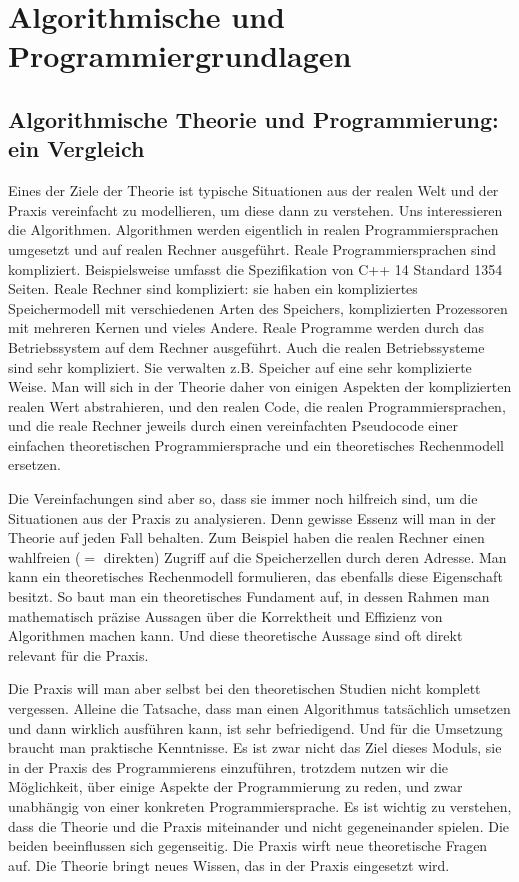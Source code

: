 \chapter{Algorithmische und Programmiergrundlagen}

\section{Algorithmische Theorie und Programmierung: ein Vergleich} 


\begin{bem}
	Eines der Ziele der Theorie ist typische Situationen aus der realen Welt und der Praxis vereinfacht zu modellieren, um diese dann zu verstehen. Uns interessieren die Algorithmen. Algorithmen werden eigentlich in realen Programmiersprachen umgesetzt und auf realen Rechner ausgeführt. Reale Programmiersprachen sind kompliziert. Beispielsweise umfasst die Spezifikation von C++ 14 Standard 1354 Seiten. Reale Rechner sind kompliziert: sie haben ein kompliziertes Speichermodell mit verschiedenen Arten des Speichers, komplizierten Prozessoren mit mehreren Kernen und vieles Andere. Reale Programme werden durch das Betriebssystem auf dem Rechner ausgeführt. Auch die realen Betriebssysteme sind sehr kompliziert. Sie verwalten z.B. Speicher auf eine sehr komplizierte Weise. Man will sich in der Theorie daher von einigen Aspekten der komplizierten realen Wert abstrahieren, und den realen Code, die realen Programmiersprachen, und die reale Rechner jeweils durch einen vereinfachten Pseudocode einer einfachen theoretischen Programmiersprache und ein theoretisches Rechenmodell ersetzen. 
	
	Die Vereinfachungen sind aber so, dass sie immer noch hilfreich sind, um die Situationen aus der Praxis zu analysieren. Denn gewisse Essenz will man in der Theorie auf jeden Fall behalten. Zum Beispiel haben die realen Rechner einen wahlfreien ($=$ direkten) Zugriff auf die Speicherzellen durch deren Adresse. Man kann ein theoretisches Rechenmodell formulieren, das ebenfalls diese Eigenschaft besitzt. So baut man ein theoretisches Fundament auf, in dessen Rahmen man mathematisch präzise Aussagen über die Korrektheit und Effizienz von Algorithmen machen kann. Und diese theoretische Aussage sind oft direkt relevant für die Praxis. 
	
	Die Praxis will man aber selbst bei den theoretischen Studien nicht komplett vergessen. Alleine die Tatsache, dass man einen Algorithmus tatsächlich umsetzen und dann wirklich ausführen kann, ist sehr befriedigend. Und für die Umsetzung braucht man praktische Kenntnisse. Es ist zwar nicht das Ziel dieses Moduls, sie in der Praxis des Programmierens einzuführen, trotzdem nutzen wir die Möglichkeit, über einige Aspekte der Programmierung zu reden, und zwar unabhängig von einer konkreten Programmiersprache. Es ist wichtig zu verstehen, dass die Theorie und die Praxis miteinander und nicht gegeneinander spielen. Die beiden beeinflussen sich gegenseitig. Die Praxis wirft neue theoretische Fragen auf. Die Theorie bringt neues Wissen, das in der Praxis eingesetzt wird. 
\end{bem} 

